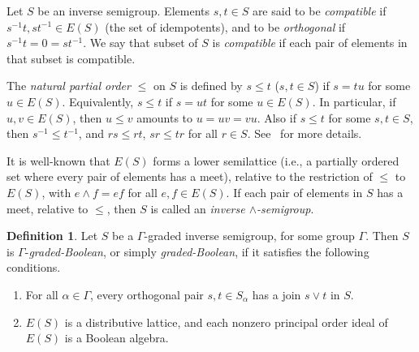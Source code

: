 \documentclass[a4paper,reqno,12pt]{amsart}
\numberwithin{equation}{section}
\theoremstyle{plain}
\theoremstyle{definition}
\newtheorem{deff}[thm]{Definition}
\begin{document}
Let $S$ be an inverse semigroup. Elements $s,t \in S$ are said to be \emph{compatible} if $s^{-1}t, st^{-1} \in E(S)$ (the set of idempotents), and to be \emph{orthogonal} if $s^{-1}t = 0 = st^{-1}$. We say that subset of $S$ is \emph{compatible} if each pair of elements in that subset is compatible. 

The \emph{natural partial order} $\leq$ on $S$ is defined by $s\leq t$ ($s,t \in S$) if $s=tu$ for some $u \in E(S)$. Equivalently, $s\leq t$ if $s=ut$ for some $u \in E(S)$. In particular, if $u,v \in E(S)$, then $u \leq v$ amounts to $u=uv=vu$. Also if $s \leq t$ for some $s,t \in S$, then $s^{-1} \leq t^{-1}$, and $rs \leq rt$, $sr \leq tr$ for all $r \in S$. See~\cite[\S 5.2]{Howie} for more details.

It is well-known that $E(S)$ forms a lower semilattice (i.e., a partially ordered set where every pair of elements has a meet), relative to the restriction of $\leq$ to $E(S)$, with $e \land f = ef$ for all $e,f \in E(S)$. If each pair of elements in $S$ has a meet, relative to $\leq$, then $S$ is called an \emph{inverse $\land$-semigroup}.

\begin{deff} \label{bool-def}
Let $S$ be a $\Gamma$-graded inverse semigroup, for some group $\Gamma$. Then $S$ is $\Gamma$-\emph{graded-Boolean}, or simply \emph{graded-Boolean}, if it satisfies the following conditions.
\begin{enumerate}[\upshape(1)]
\item For all $\alpha \in \Gamma$, every orthogonal pair $s,t \in S_{\alpha}$ has a join $s\vee t$ in $S$.

\smallskip 

\item $E(S)$ is a distributive lattice, and each nonzero principal order ideal of $E(S)$ is a Boolean algebra.
\end{enumerate}
\end{deff}
\end{document}
